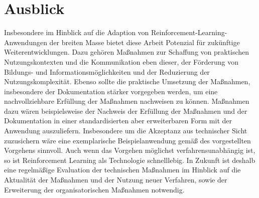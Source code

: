 \chapter{Ausblick}\label{chap:ausblick}
Insbesondere im Hinblick auf die Adaption von Reinforcement-Learning-Anwendungen der breiten Masse bietet diese Arbeit Potenzial für zukünftige Weiterentwicklungen.
Dazu gehören Maßnahmen zur Schaffung von praktischen Nutzungskontexten und die Kommunikation eben dieser, der Förderung von Bildungs- und Informationsmöglichkeiten und der Reduzierung der Nutzungskomplexität.
\ab
Ebenso sollte die praktische Umsetzung der Maßnahmen, insbesondere der Dokumentation stärker vorgegeben werden, um eine nachvollziehbare Erfüllung der Maßnahmen nachweisen zu können.
Maßnahmen dazu wären beispielsweise der Nachweis der Erfüllung der Maßnahmen und der Dokumentation in einer standardisierten aber erweiterbaren Form mit der Anwendung auszuliefern.
Insbesondere um die Akzeptanz aus technischer Sicht zuzusichern wäre eine exemplarische Beispielanwendung gemäß des vorgestellten Vorgehens sinnvoll.
\ab 
Auch wenn das Vorgehen möglichst verfahrensunabhängig ist, so ist Reinforcement Learning als Technologie schnelllebig.
In Zukunft ist deshalb eine regelmäßige Evaluation der technischen Maßnahmen im Hinblick auf die Aktualität der Maßnahmen und der Nutzung neuer Verfahren, sowie der Erweiterung der organisatorischen Maßnahmen notwendig.